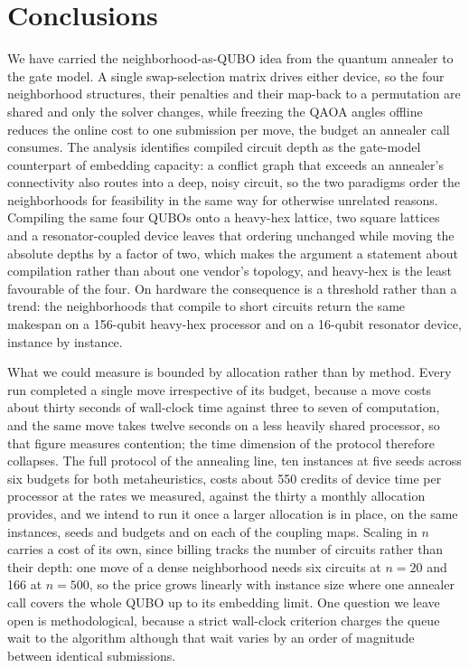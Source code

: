 \documentclass{svproc}
\begin{document}
\section{Conclusions}
\label{sec:conclusions}
We have carried the neighborhood-as-QUBO idea from the quantum annealer to the
gate model. A single swap-selection matrix drives either device, so the four
neighborhood structures, their penalties and their map-back to a permutation
are shared and only the solver changes, while freezing the QAOA angles offline
reduces the online cost to one submission per move, the budget an
annealer call consumes. The analysis identifies compiled circuit depth as the
gate-model counterpart of embedding capacity: a conflict graph that exceeds an
annealer's connectivity also routes into a deep, noisy circuit, so the two
paradigms order the neighborhoods for feasibility in the same way for
otherwise unrelated reasons. Compiling the same four QUBOs onto a heavy-hex
lattice, two square lattices and a resonator-coupled device leaves that
ordering unchanged while moving the absolute depths by a factor of two, which
makes the argument a statement about compilation rather than about one
vendor's topology, and heavy-hex is the least favourable of the four. On
hardware the consequence is a threshold rather than a trend: the neighborhoods
that compile to short circuits return the same makespan on a 156-qubit
heavy-hex processor and on a 16-qubit resonator device, instance by instance.

What we could measure is bounded by allocation rather than by method. Every
run completed a single move irrespective of its budget, because a move costs
about thirty seconds of wall-clock time against three to seven of computation,
and the same move takes twelve seconds on a less heavily shared processor, so
that figure measures contention; the time dimension of the protocol therefore
collapses. The full protocol of the annealing line, ten instances at five
seeds across six budgets for both metaheuristics, costs about 550 credits of
device time per processor at the rates we measured, against the thirty a
monthly allocation provides, and we intend to run it once a larger allocation
is in place, on the same instances, seeds and budgets and on each of the
coupling maps. Scaling in $n$ carries a cost of its own, since billing tracks
the number of circuits rather than their depth: one move of a dense
neighborhood needs six circuits at $n=20$ and 166 at $n=500$, so the price
grows linearly with instance size where one annealer call covers the whole
QUBO up to its embedding limit. One question we leave open is methodological,
because a strict wall-clock criterion charges the queue wait to the algorithm
although that wait varies by an order of magnitude between identical
submissions.
\end{document}
